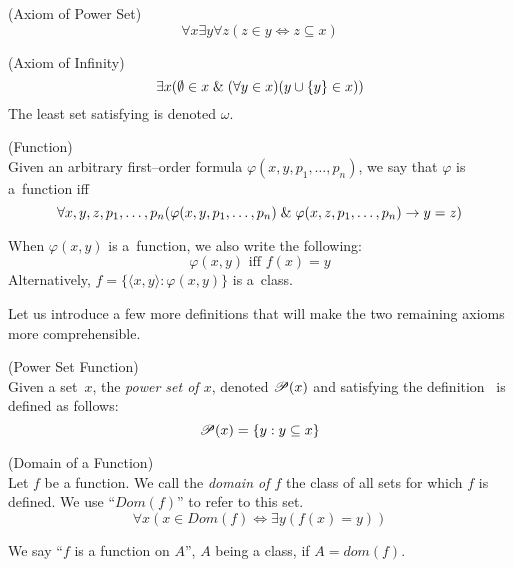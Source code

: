 \begin{definition}{(Axiom of Power Set)}\label{def:powerset}
\begin{equation}
\forall x \exists y \forall z (z \in y \iff z \subseteq x) %
\end{equation}
\end{definition}

\begin{definition}{(Axiom of Infinity)}\label{def:infinity} %
\begin{equation}
\exists x (\emptyset \in x \mathrel{\&} (\forall y \in x)(y\cup\{y\} \in x))\label{eq:axiom_of_infinity}
\end{equation}
The least set satisfying  is denoted $\omega$.
\end{definition}

\begin{definition}{(Function)}\label{def:function}\\
Given an arbitrary first–order formula $\varphi(x, y, p_1, \ldots, p_n)$, we say that $\varphi$ is a~function iff
\begin{equation}\label{def:function_formula}
\forall x, y, z, p_1, \ldots, p_n (\varphi(x, y, p_1, \ldots, p_n) \mathrel{\&} \varphi(x, z, p_1, \ldots, p_n) \rightarrow y = z)
\end{equation}
\end{definition}
When $\varphi(x, y)$ is a~function, we also write the following:
\begin{equation}
\varphi(x, y) \mbox{ iff } f(x) = y
\end{equation}
Alternatively, $f = \{\langle x, y \rangle : \varphi(x, y)\}$ is a~class.

Let us introduce a few more definitions that will make the two remaining axioms more comprehensible.
\begin{definition}{(Power Set Function)}\\
Given a set~$x$, the \emph{power set of $x$}, denoted $\mathscr{P} (x)$ and satisfying the definition \, is defined as follows:
\begin{equation}
\mathscr{P} (x) = \{y: y \subseteq x\}
\end{equation}
\end{definition}

\begin{definition}{(Domain of a Function)}\label{def:dom}\\
Let $f$ be a function. We call the \emph{domain of $f$} the class of all sets for which $f$ is defined. We use ``$Dom(f)$'' to refer to this set.
\begin{equation}
\forall x (x \in Dom(f) \iff \exists y (f(x) = y))
\end{equation}
\end{definition}
We say ``$f$ is a function on $A$'', $A$ being a class, if $A = dom(f)$.

